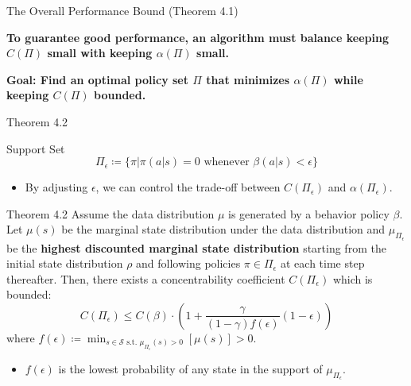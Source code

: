 \documentclass[11pt]{beamer}
\newcommand{\mc}[1]{\mathcal{#1}}
\newcommand{\tb}[1]{\textbf{#1}}
\begin{document}
\begin{frame}{The Overall Performance Bound (Theorem 4.1)}
    \begin{center}
        \tb{To guarantee good performance, an algorithm must balance keeping $C(\Pi)$ small with keeping $\alpha(\Pi)$ small.}
    \end{center}

    \vspace{1mm}
    \begin{center}
        \tb{Goal: Find an optimal policy set $\Pi$ that minimizes $\alpha(\Pi)$ while keeping $C(\Pi)$ bounded.}
    \end{center}
\end{frame}

\begin{frame}{Theorem 4.2}

    \begin{block}{Support Set}
        \[
            \Pi_{\epsilon} \coloneqq \{\pi | \pi(a|s) =0 \text{ whenever } \beta(a|s) < \epsilon\}
        \]

        \begin{itemize}
            \item By adjusting $\epsilon$, we can control the trade-off between $C(\Pi_\epsilon)$ and $\alpha(\Pi_\epsilon)$.
        \end{itemize}
    \end{block}
    \begin{block}{Theorem 4.2}
        Assume the data distribution $\mu$ is generated by a behavior policy $\beta$.
        Let $\mu(s)$ be the marginal state distribution under the data distribution and $\mu_{\Pi_\epsilon}$ be the \tb{highest discounted marginal state distribution} starting from the initial state distribution $\rho$ and following policies $\pi \in \Pi_\epsilon$ at each time step thereafter.
        Then, there exists a concentrability coefficient $C(\Pi_\epsilon)$ which is bounded:
        \[
            C(\Pi_{\epsilon}) \leq C(\beta) \cdot \left(1 + \frac{\gamma}{(1-\gamma)f(\epsilon)}(1-\epsilon)\right)
        \]
        where $f(\epsilon) \coloneqq \min_{s \in \mc{S} \text{ s.t. } \mu_{\Pi_\epsilon}(s)>0}[\mu(s)]>0$.
    \end{block}
    \begin{itemize}
        \item $f(\epsilon)$ is the lowest probability of any state in the support of $\mu_{\Pi_\epsilon}$.
    \end{itemize}
\end{frame}
\end{document}
